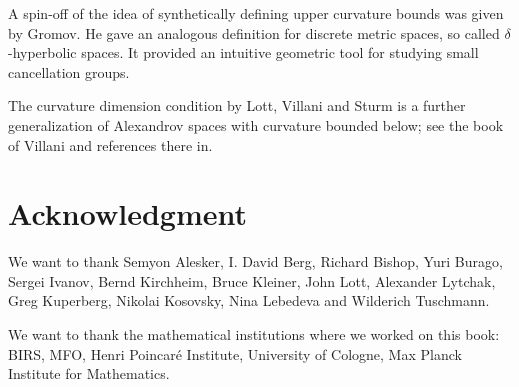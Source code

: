 A spin-off of the idea of synthetically defining upper curvature bounds 
was given by Gromov. 
He gave an analogous definition for discrete metric spaces, so called $\delta$-hyperbolic spaces. 
It provided an intuitive geometric tool for studying small cancellation groups.

The curvature dimension condition by Lott, Villani and Sturm is a further generalization of Alexandrov spaces with curvature bounded below; see the book of Villani \cite{villani} and references there
in.

\section*{Acknowledgment}
We want to thank 
Semyon Alesker,
I. David Berg,
Richard Bishop, 
Yuri Burago, 
Sergei Ivanov,
Bernd Kirchheim, 
Bruce Kleiner, 
John Lott,
Alexander Lytchak, 
Greg Kuperberg, 
Nikolai Kosovsky, 
Nina Lebedeva and
Wilderich Tuschmann.


We want to thank the mathematical institutions where we worked on this book:
BIRS, 
MFO, 
Henri Poincar\'{e} Institute,
University of Cologne, 
Max Planck Institute for Mathematics.



